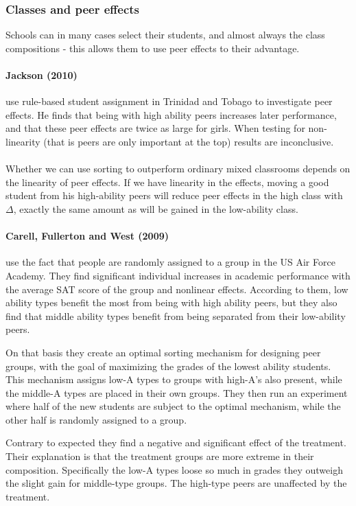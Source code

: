 \documentclass[12pt, a4paper]{article}
\begin{document}
\begin{multicols}{2}
\subsubsection{Classes and peer effects}
Schools can in many cases select their students, and almost always the class compositions - this allows them to use peer effects to their advantage.

\paragraph{Jackson (2010)} use rule-based student assignment in Trinidad and Tobago to investigate peer effects. He finds that being with high ability peers increases later performance, and that these peer effects are twice as large for girls. When testing for non-linearity (that is peers are only important at the top) results are inconclusive. 
\\ \\
Whether we can use sorting to outperform ordinary mixed classrooms depends on the linearity of peer effects. If we have linearity in the effects, moving a good student from his high-ability peers will reduce peer effects in the high class with $\Delta$, exactly the same amount as will be gained in the low-ability class. 

\paragraph{Carell, Fullerton and West (2009)} use the fact that people are randomly assigned to a group in the US Air Force Academy. They find significant individual increases in academic performance with the average SAT score of the group and nonlinear effects. According to them, low ability types benefit the most from being with high ability peers, but they also find that middle ability types benefit from being separated from their low-ability peers. 

On that basis they create an optimal sorting mechanism for designing peer groups, with the goal of maximizing the grades of the lowest ability students. This mechanism assigns low-A types to groups with high-A's also present, while the middle-A types are placed in their own groups. They then run an experiment where half of the new students are subject to the optimal mechanism, while the other half is randomly assigned to a group.

Contrary to expected they find a negative and significant effect of the treatment. Their explanation is that the treatment groups are more extreme in their composition. Specifically the low-A types loose so much in grades they outweigh the slight gain for middle-type groups. The high-type peers are unaffected by the treatment. 


\end{multicols}
\end{document}
